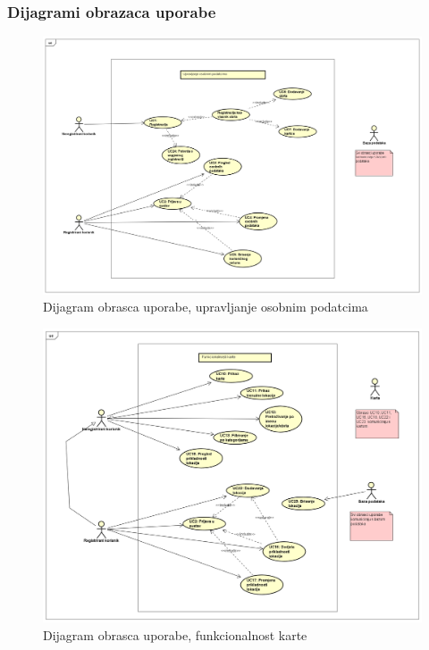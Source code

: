             \subsubsection{Dijagrami obrazaca uporabe}
            
            \begin{figure}[H]
			    \includegraphics[width=\textwidth]{slike/dijagram1.png} 
			        \caption{Dijagram obrasca uporabe, upravljanje osobnim podatcima}
			    \label{fig:Upravljanje osobnim podatcima}
		    \end{figure}
		    
		    \begin{figure}[H]
			    \includegraphics[width=\textwidth]{slike/dijagram2.png} 
			        \caption{Dijagram obrasca uporabe, funkcionalnost karte}
			    \label{fig:Funkcionalnosti karte}
		    \end{figure}
		    

